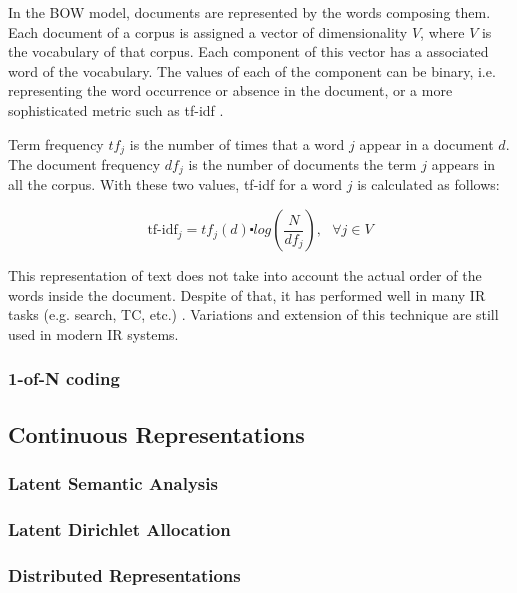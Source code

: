 In the \ac{BOW} model, documents are represented by the words composing them.
Each document of a corpus is assigned a vector of dimensionality $V$, where $V$ is the
vocabulary of that corpus. Each component of this vector has a associated word of
the vocabulary. The values of each of the component can be binary, i.e. representing the
word occurrence or absence in the document, or a more sophisticated metric
such as \ac{tf-idf} \cite{Salton88term-weightingapproaches}.

Term frequency $tf_j$  is the number of times that a word $j$ appear in a
document $d$. The document frequency  $df_{j}$  is the number of documents
the term $j$ appears in all the corpus.  With these two values,  \ac{tf-idf}  for a  word $j$ is  calculated as follows:

\begin{equation*}
  \label{eq:tf-idf}
  \text{tf-idf}_{j}=tf_{j}(d)\centerdot log(\frac{N}{df_{j}}),\,\,\,\,\forall
  j \in V
\end{equation*}

This representation of text does not take  into account the actual order of the words inside the document. Despite
of that, it has  performed well in many \ac{IR} tasks (e.g. search, \ac{TC},
etc.) \cite{Sebastiani02}. Variations and extension of this technique are
still used in modern \ac{IR} systems.

 \subsubsection{1-of-N coding}
 \label{sec:1_of_coding}

 \subsection{Continuous Representations}
 \label{sec:sub_continuous_representation}

 \subsubsection{Latent Semantic Analysis}
 \label{sec:rel_local_representation}

 \subsubsection{Latent Dirichlet Allocation}
 \label{sec:rel_lda}

 \subsubsection{Distributed Representations}
 \label{sec:dis_rep}



